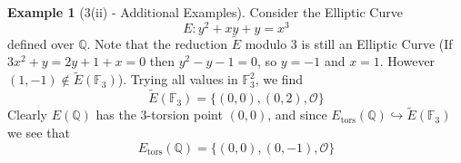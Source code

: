 \documentclass{scrartcl}
\newcommand{\F}{\mathbb{F}}
\newcommand{\Q}{\mathbb{Q}}
\renewcommand{\O}{\mathcal{O}}
\theoremstyle{definition}
\newtheorem{example}[subsection]{Example}
\begin{document}
\begin{example}[3(ii) - Additional Examples]
    Consider the Elliptic Curve
    \begin{equation*}
        E: y^2 + x y + y = x^3
    \end{equation*}
    defined over $\Q$.
    Note that the reduction $\tilde{E}$ modulo $3$ is still an Elliptic Curve (If $3x^2 + y = 2y + 1 + x = 0$ then $y^2 - y - 1 = 0$, so $y = -1$ and $x = 1$. However $(1, -1) \notin \tilde{E}(\F_3)$).
    Trying all values in $\F_3^2$, we find
    \begin{equation*}
        \tilde{E}(\F_3) = \{ (0, 0), (0, 2), \O \} 
    \end{equation*}
    Clearly $E(\Q)$ has the 3-torsion point $(0, 0)$, and since $E_{\mathrm{tors}}(\Q) \hookrightarrow \tilde{E}(\F_3)$ we see that
    \begin{equation*}
        E_{\mathrm{tors}}(\Q) = \{ (0, 0), (0, -1), \O \}
    \end{equation*}
\end{example}
\end{document}
